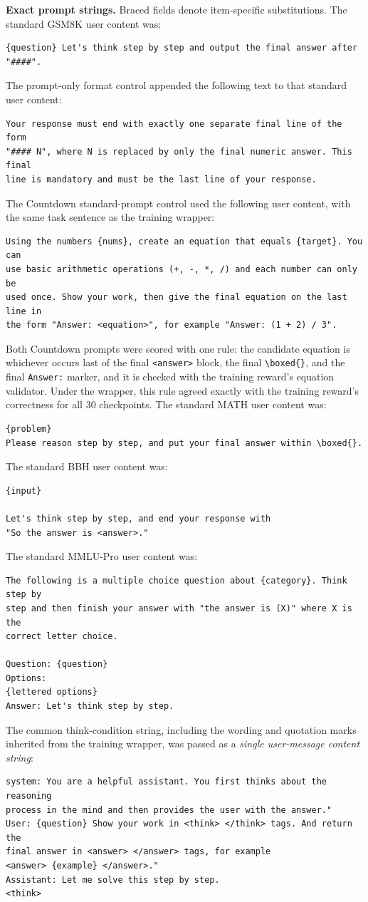 \documentclass[ai,article,submit,oneauthor]{Definitions/mdpi}
\begin{document}
\noindent\textbf{Exact prompt strings.}
Braced fields denote item-specific substitutions. The standard GSM8K user content was:
{\footnotesize
\begin{verbatim}
{question} Let's think step by step and output the final answer after "####".
\end{verbatim}
}
The prompt-only format control appended the following text to that standard user content:
{\footnotesize
\begin{verbatim}
Your response must end with exactly one separate final line of the form
"#### N", where N is replaced by only the final numeric answer. This final
line is mandatory and must be the last line of your response.
\end{verbatim}
}
The Countdown standard-prompt control used the following user content, with the same task sentence as the training wrapper:
{\footnotesize
\begin{verbatim}
Using the numbers {nums}, create an equation that equals {target}. You can
use basic arithmetic operations (+, -, *, /) and each number can only be
used once. Show your work, then give the final equation on the last line in
the form "Answer: <equation>", for example "Answer: (1 + 2) / 3".
\end{verbatim}
}
Both Countdown prompts were scored with one rule: the candidate equation is whichever occurs last of the final \texttt{<answer>} block, the final \texttt{\textbackslash boxed\{\}}, and the final \texttt{Answer:} marker, and it is checked with the training reward's equation validator. Under the wrapper, this rule agreed exactly with the training reward's correctness for all 30 checkpoints.
The standard MATH user content was:
\begin{verbatim}
{problem}
Please reason step by step, and put your final answer within \boxed{}.
\end{verbatim}
The standard BBH user content was:
\begin{verbatim}
{input}

Let's think step by step, and end your response with
"So the answer is <answer>."
\end{verbatim}
The standard MMLU-Pro user content was:
\begin{verbatim}
The following is a multiple choice question about {category}. Think step by
step and then finish your answer with "the answer is (X)" where X is the
correct letter choice.

Question: {question}
Options:
{lettered options}
Answer: Let's think step by step.
\end{verbatim}
The common think-condition string, including the wording and quotation marks inherited from the training
wrapper, was passed as a \emph{single user-message content string}:
\begin{verbatim}
system: You are a helpful assistant. You first thinks about the reasoning
process in the mind and then provides the user with the answer."
User: {question} Show your work in <think> </think> tags. And return the
final answer in <answer> </answer> tags, for example
<answer> {example} </answer>."
Assistant: Let me solve this step by step.
<think>
\end{verbatim}
\end{document}
